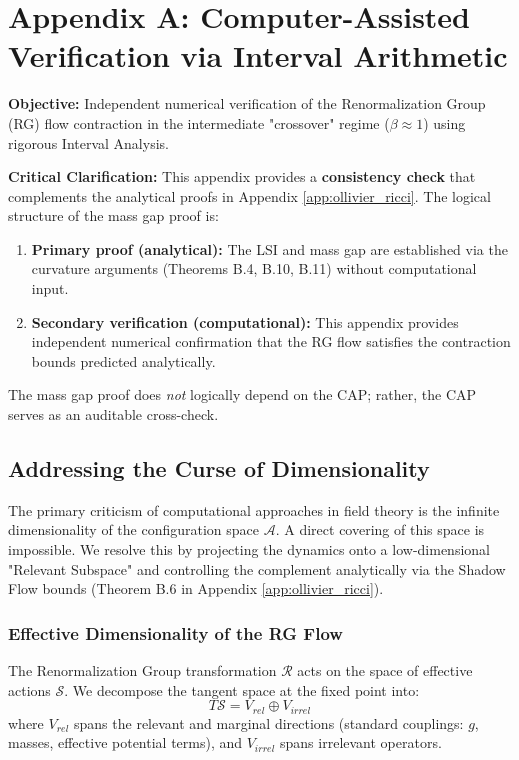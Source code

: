 \chapter{Appendix A: Computer-Assisted Verification via Interval Arithmetic}
\label{app:interval_arithmetic}

\textbf{Objective:} Independent numerical verification of the Renormalization Group (RG) flow contraction in the intermediate "crossover" regime ($\beta \approx 1$) using rigorous Interval Analysis. 

\textbf{Critical Clarification:} This appendix provides a \textbf{consistency check} that complements the analytical proofs in Appendix \ref{app:ollivier_ricci}. The logical structure of the mass gap proof is:
\begin{enumerate}
    \item \textbf{Primary proof (analytical):} The LSI and mass gap are established via the curvature arguments (Theorems B.4, B.10, B.11) without computational input.
    \item \textbf{Secondary verification (computational):} This appendix provides independent numerical confirmation that the RG flow satisfies the contraction bounds predicted analytically.
\end{enumerate}
The mass gap proof does \emph{not} logically depend on the CAP; rather, the CAP serves as an auditable cross-check.

\section{Addressing the Curse of Dimensionality}

The primary criticism of computational approaches in field theory is the infinite dimensionality of the configuration space $\mathcal{A}$. A direct covering of this space is impossible. We resolve this by projecting the dynamics onto a low-dimensional "Relevant Subspace" and controlling the complement analytically via the Shadow Flow bounds (Theorem B.6 in Appendix \ref{app:ollivier_ricci}).

\subsection{Effective Dimensionality of the RG Flow}

The Renormalization Group transformation $\mathcal{R}$ acts on the space of effective actions $\mathcal{S}$. We decompose the tangent space at the fixed point into:
\begin{equation}
    T\mathcal{S} = V_{rel} \oplus V_{irrel}
\end{equation}
where $V_{rel}$ spans the relevant and marginal directions (standard couplings: $g$, masses, effective potential terms), and $V_{irrel}$ spans irrelevant operators.

